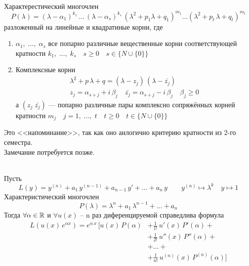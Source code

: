 \begin{Note}[<<Напоминание>>]~\\
    Характерестический многочлен
    \[
        P(\lambda)=(\lambda-\alpha_1)^{k_1}\,\dots\,(\lambda-\alpha_s)^{k_s}\,(\lambda^2+p_1 \lambda+q_1)^{m_1}\dots(\lambda^2+p_t\, \lambda+q_t)^{m_t}
    \]
    разложенный на линейные и квадратиные корни, где
    \begin{enumerate}
        \item $\alpha_1,\; \dots,\; \alpha_s$ все попарно различные вещественные корни соответствующей кратности $k_1,\; \dots,\; k_s \quad s \geqslant 0 \quad s \in \{N \cup \{0\}\}$
        
        \item Комплексные корни 
        \begin{gather*}
            \lambda^2+p\,\lambda+q=(\lambda-z_j)\,(\lambda-\bar{z_j})\\
            z_j = \alpha_{s + j} + i\,\beta_j \quad \bar{z_j} = \alpha_{s + j} - i\,\beta_j \quad \beta_j \geqslant 0
        \end{gather*}
        а $(z_j\; \bar{z_j})$ --- попарно различные пары комплексно сопряжённых корней кратности $m_j \quad j=1,\; \dots,\; t \quad t \geqslant 0 \quad t \in \{N \cup \{0\}\}$
    \end{enumerate}
\end{Note}

\begin{Note}
    Это <<напоминание>>, так как оно анлогично критерию кратности из 2-го семестра.\\
    Замечание потребуется позже. 
\end{Note}

\begin{Lem}~\\
    Пусть 
    \[
        L(y)=y^{(n)}+a_1\,y^{(n-1)}+a_{n-1}\,y'+\dots+a_n\,y \qquad y^{(n)} \mapsto \lambda^k \quad y \mapsto 1
    \]
    Характеристический многочлен
    \[
        P(\lambda)= \lambda^n + a_1\,\lambda^{n-1} + \dots + a_n
    \]
    Тогда $\forall \alpha \in \mathbb{R}$ и $\forall u(x)$ -- n раз диференцируемой справедлива формула 
    \begin{align*}
        L(u(x)\,e^{\alpha x})=e^{\alpha\,x}\, [u(x)\,P(\alpha)&+\frac{1}{1!}\,u'(x)\,P'(\alpha)+\\
        &+\frac{1}{2!}\,u''(x)\,P''(\alpha)+\\
        &+\dots+\\
        &+\frac{1}{n!}\,u^{(n)}(x)\,P^{(n)}(\alpha)]
    \end{align*}
\end{Lem}

